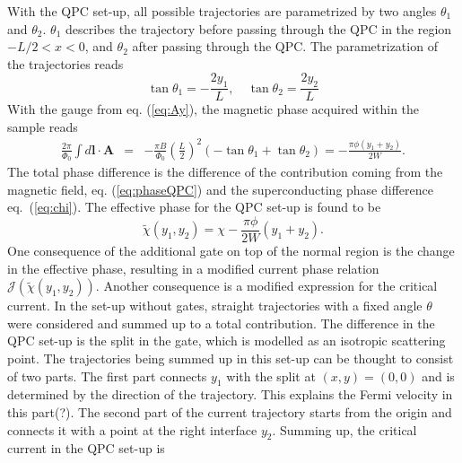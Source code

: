 With the QPC set-up, all possible trajectories are parametrized by two angles $\theta_1$ and $\theta_2$. $\theta_1$ describes the trajectory before passing through the QPC in the region $ -L/2 < x < 0$, and  $\theta_2$ after passing through the QPC. The parametrization of the trajectories reads
\begin{equation}
\tan \theta_1 = - \frac{2 y_1}{L}, \quad \tan \theta_2 = \frac{2 y_2}{L}
\label{eq:QPCparametrization}
\end{equation}
With the gauge from eq. (\ref{eq:Ay}), the magnetic phase acquired within the sample reads
\begin{eqnarray}
\frac{2\pi}{\Phi_0} \int d\mathbf{l} \cdot \mathbf{A}  &=&
-\frac{\pi B}{\Phi_0}\left(\frac{L}{2}\right)^2
\left(-\tan\theta_1 + \tan\theta_2\right) =
-\frac{\pi \phi (y_1+y_2)}{2 W}.
\label{eq:phaseQPC}
\end{eqnarray}
The total phase difference is the difference of the contribution coming from the magnetic field, eq. (\ref{eq:phaseQPC}) and the superconducting phase difference eq.~(\ref{eq:chi}). The effective phase for the QPC set-up is found to be
\begin{equation}
\tilde{\chi}(y_1,y_2)=\chi-\frac{ \pi \phi }{2W}(y_1+y_2).
\label{eq:chiQPC}
\end{equation}
One consequence of the additional gate on top of the normal region is the change in the effective phase, resulting in a modified current phase relation $\mathcal{J}(\tilde{\chi}(y_1, y_2))$. Another consequence is a modified expression for the critical current. In the set-up without gates, straight trajectories with a fixed angle $\theta$ were considered and summed up to a total contribution. The difference in the QPC set-up is the split in the gate, which is modelled as an isotropic scattering point. The trajectories being summed up in this set-up can be thought to consist of two parts. The first part connects $y_1$ with the split at $(x, y) = (0, 0)$ and is determined by the direction of the trajectory. This explains the Fermi velocity in this part(?). The second part of the current trajectory starts from the origin and connects it with a point at the right interface $y_2$. Summing up, the  critical current in the QPC set-up is
